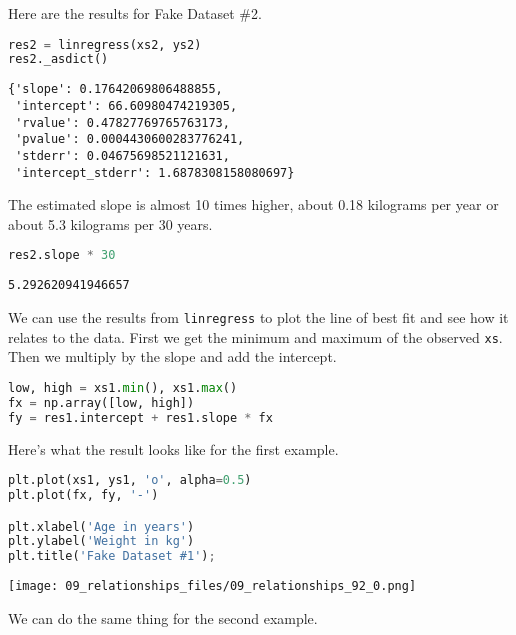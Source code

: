 Here are the results for Fake Dataset \#2.

\begin{lstlisting}[language=Python,style=source]
res2 = linregress(xs2, ys2)
res2._asdict()
\end{lstlisting}

\begin{lstlisting}[style=output]
{'slope': 0.17642069806488855,
 'intercept': 66.60980474219305,
 'rvalue': 0.47827769765763173,
 'pvalue': 0.0004430600283776241,
 'stderr': 0.04675698521121631,
 'intercept_stderr': 1.6878308158080697}
\end{lstlisting}

The estimated slope is almost 10 times higher, about 0.18 kilograms per
year or about 5.3 kilograms per 30 years.

\begin{lstlisting}[language=Python,style=source]
res2.slope * 30
\end{lstlisting}

\begin{lstlisting}[style=output]
5.292620941946657
\end{lstlisting}

We can use the results from \passthrough{\lstinline!linregress!} to plot
the line of best fit and see how it relates to the data. First we get
the minimum and maximum of the observed \passthrough{\lstinline!xs!}.
Then we multiply by the slope and add the intercept.

\begin{lstlisting}[language=Python,style=source]
low, high = xs1.min(), xs1.max()
fx = np.array([low, high])
fy = res1.intercept + res1.slope * fx
\end{lstlisting}

Here's what the result looks like for the first example.

\begin{lstlisting}[language=Python,style=source]
plt.plot(xs1, ys1, 'o', alpha=0.5)
plt.plot(fx, fy, '-')

plt.xlabel('Age in years')
plt.ylabel('Weight in kg')
plt.title('Fake Dataset #1');
\end{lstlisting}

\begin{center}
\texttt{[image: 09\_relationships\_files/09\_relationships\_92\_0.png]}
\end{center}

We can do the same thing for the second example.

